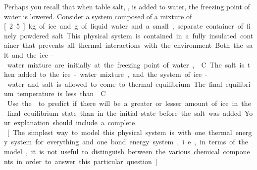 \label{FNT1.1.4-3}

Perhaps you recall that when table salt, , is added to water, the freezing point of water is lowered. Consider a system composed of a mixture of \unit[2.5]{kg} of ice and \unit[50]{g} of liquid water and a small, separate container of finely powdered salt. This physical system is contained in a fully insulated container that prevents all thermal interactions with the environment. Both the salt and the ice-water mixture are initially at the freezing point of water, \unit[0]{\textdegree C}. The salt is then added to the ice-water mixture, and the system of ice-water and salt is allowed to come to thermal equilibrium. The final equilibrium temperature is less than \unit[0]{\textdegree C}.\\

Use the \EnergyInteractionModel{} to predict if there will be a greater or lesser amount of ice in the final equilibrium state than in the initial state before the salt was added. Your explanation should include a complete \EnergyDiagram{}.\\

[The simplest way to model this physical system is with one thermal energy system for everything and one bond energy system, i.e., in terms of the model, it is not useful to distinguish between the various chemical components in order to answer this particular question.]